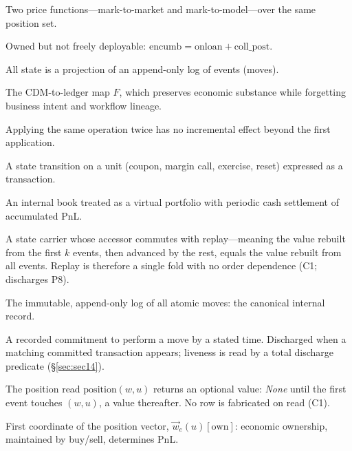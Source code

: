 \begin{description}[style=nextline]
\item[Dual valuation] Two price functions---mark-to-market and mark-to-model---over the same position set.

\item[Encumbrance] Owned but not freely deployable: $\mathrm{encumb}=\mathrm{onloan}+\mathrm{coll\_post}$.

\item[Event sourcing] All state is a projection of an append-only log of events (moves).

\item[Forgetful mapping] The CDM-to-ledger map $F$, which preserves economic substance while forgetting business intent and workflow lineage.

\item[Idempotency] Applying the same operation twice has no incremental effect beyond the first application.

\item[Lifecycle event] A state transition on a unit (coupon, margin call, exercise, reset) expressed as a transaction.

\item[Managed account] An internal book treated as a virtual portfolio with periodic cash settlement of accumulated PnL.

\item[Monotone carrier] A state carrier whose accessor commutes with replay---meaning the value rebuilt from the first $k$ events, then advanced by the rest, equals the value rebuilt from all events. Replay is therefore a single fold with no order dependence (C1; discharges P8).

\item[Move stream] The immutable, append-only log of all atomic moves: the canonical internal record.

\item[Obligation] A recorded commitment to perform a move by a stated time. Discharged when a matching committed transaction appears; liveness is read by a total discharge predicate (\S\ref{sec:sec14}).

\item[Option accessor] The position read $\mathrm{position}(w,u)$ returns an optional value: \emph{None} until the first event touches $(w,u)$, a value thereafter. No row is fabricated on read (C1).

\item[Own] First coordinate of the position vector, $\vec{w}_e(u)[\mathrm{own}]$: economic ownership, maintained by buy/sell, determines PnL.


\end{description}
